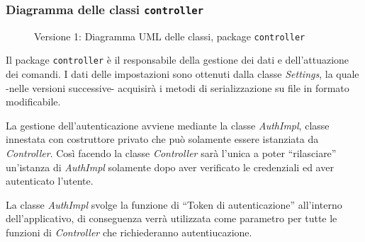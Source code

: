 \subsubsection{Diagramma delle classi \texttt{controller}}
\vspace{0.5cm}
\begin{figure}[H]
    \centering
    \caption{Versione 1: Diagramma UML delle classi, package \texttt{controller}}
    \label{fig:class_controller_v_1}
\end{figure}

Il package \texttt{controller} è il responsabile della gestione dei dati e dell'attuazione dei comandi.
I dati delle impostazioni sono ottenuti dalla classe \textit{Settings}, la quale -nelle versioni successive-
acquisirà i metodi di serializzazione su file in formato modificabile. 

La gestione dell'autenticazione avviene mediante la classe \textit{AuthImpl}, classe innestata con costruttore privato
che può solamente essere istanziata da \textit{Controller}.
Così facendo la classe \textit{Controller} sarà l'unica a poter ``rilasciare'' un'istanza di \textit{AuthImpl} 
solamente dopo aver verificato le credenziali ed aver autenticato l'utente.

La classe \textit{AuthImpl} svolge la funzione di ``Token di autenticazione'' all'interno dell'applicativo, 
di conseguenza verrà utilizzata come parametro per tutte le funzioni di \textit{Controller} che richiederanno autentiucazione.